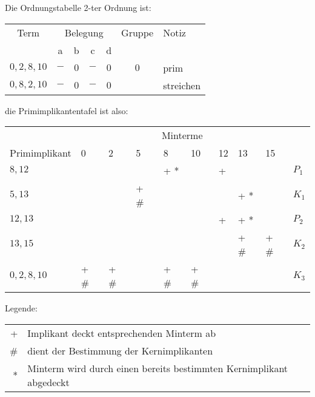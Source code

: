 \begin{center}
Die Ordnungstabelle 2-ter Ordnung ist:

\begin{tabular}{c *{4}{c} c l}
	Term       & \multicolumn{4}{c}{Belegung} & Gruppe & Notiz \\
	~          & a   & b   & c   & d   & ~    & ~              \\ \hline
	$0,2,8,10$ & $-$ & $0$ & $-$ & $0$ & $0$  & prim           \\
	$0,8,2,10$ & $-$ & $0$ & $-$ & $0$ & ~    & streichen      \\
\end{tabular}
\end{center}

\begin{center}
die Primimplikantentafel ist also:
\begin{tabular}{l|*{8}{l|}l}
                & \multicolumn{8}{c|}{Minterme}                       & ~     \\
  Primimplikant & 0    & 2    & 5    & 8    & 10   & 12 & 13   & 15   & ~     \\ \hline
  $8,12$        & ~    & ~    & ~    & + *  & ~    & +  & ~    & ~    & $P_1$ \\
  $5,13$        & ~    & ~    & + \# & ~    & ~    & ~  & + *  & ~    & $K_1$ \\
  $12,13$       & ~    & ~    & ~    & ~    & ~    & +  & + *  & ~    & $P_2$ \\
  $13,15$       & ~    & ~    & ~    & ~    & ~    & ~  & + \# & + \# & $K_2$ \\
  $0,2,8,10$    & + \# & + \# & ~    & + \# & + \# & ~  & ~    & ~    & $K_3$ \\
\end{tabular}
\end{center}

Legende:

\begin{tabular}{rl}
+ & Implikant deckt entsprechenden Minterm ab \\
\# & dient der Bestimmung der Kernimplikanten \\
* & Minterm wird durch einen bereits bestimmten Kernimplikant abgedeckt \\
\end{tabular}

